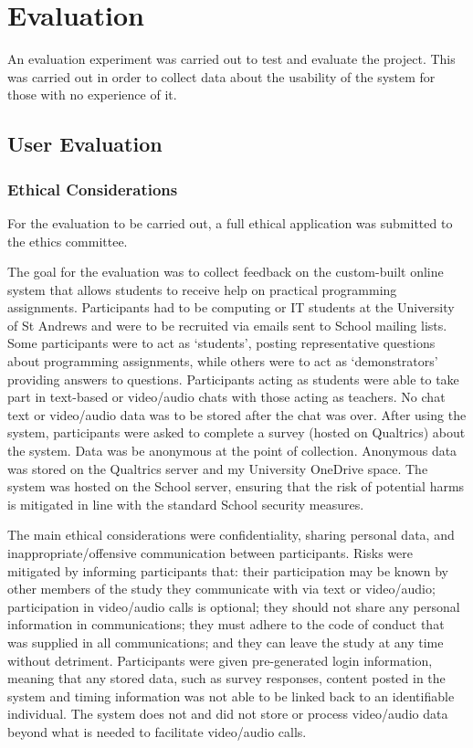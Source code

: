 \chapter{Evaluation}
An evaluation experiment was carried out to test and evaluate the project. This was carried out in order to collect data about the usability of the system for those with no experience of it. 

\section{User Evaluation}\label{sec:experiment}

\subsection{Ethical Considerations}

For the evaluation to be carried out, a full ethical application was submitted to the ethics committee. 

The goal for the evaluation was to collect feedback on the custom-built online system that allows students to receive help on practical programming assignments. Participants had to be computing or IT students at the University of St Andrews and were to be recruited via emails sent to School mailing lists. Some participants were to act as ‘students’, posting representative questions about programming assignments, while others were to act as ‘demonstrators’ providing answers to questions. Participants acting as students were able to take part in text-based or video/audio chats with those acting as teachers. No chat text or video/audio data was to be stored after the chat was over. After using the system, participants were asked to complete a survey (hosted on Qualtrics) about the system. Data was be anonymous at the point of collection. Anonymous data was stored on the Qualtrics server and my University OneDrive space.
The system was hosted on the School server, ensuring that the risk of potential harms is mitigated in line with the standard School security measures.

The main ethical considerations were confidentiality, sharing personal data, and inappropriate/offensive communication between participants. Risks were mitigated by informing participants that: their participation may be known by other members of the study they communicate with via text or video/audio; participation in video/audio calls is optional; they should not share any personal information in communications; they must adhere to the code of conduct that was supplied in all communications; and they can leave the study at any time without detriment.
Participants were given pre-generated login information, meaning that any stored data, such as survey responses, content posted in the system and timing information was not able to be linked back to an identifiable individual. The system does not and did not store or process video/audio data beyond what is needed to facilitate video/audio calls.

